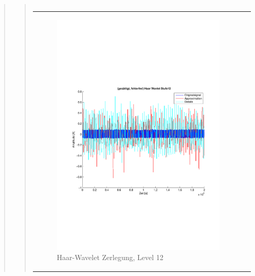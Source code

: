 \begin{quote}
\begin{quote}
\begin{center}
\begin{tabular}{ll}
                \end{tabular}
                \end{center}
    
                
                
                    \begin{center}
                \begin{tabular}{ll}
    
                \hspace{-8em}
                    \begin{minipage}{0.6\textwidth}
    
                        \begin{figure}[H]
                            \label{fig:}
                            \includegraphics[scale=0.4, trim = 2cm 6cm 1cm
                            7.5cm,
                            clip]{./Bilder/Termin8/fehlerfrei_gesaettigt_Haar_Wavlet_lvl_12}
                            \caption{Haar-Wavelet Zerlegung, Level 12}
                        \end{figure}
    

\end{minipage}
\end{tabular}
\end{center}
\end{quote}
\end{quote}
